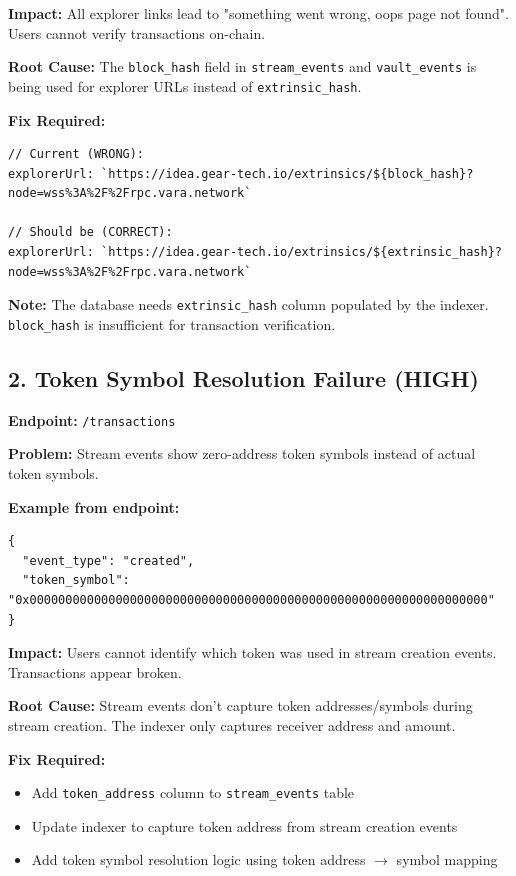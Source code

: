 \documentclass[11pt,a4paper]{article}
\begin{document}
\textbf{Impact:} All explorer links lead to "something went wrong, oops page not found". Users cannot verify transactions on-chain.

\textbf{Root Cause:} The \texttt{block\_hash} field in \texttt{stream\_events} and \texttt{vault\_events} is being used for explorer URLs instead of \texttt{extrinsic\_hash}.

\textbf{Fix Required:}
\begin{lstlisting}
// Current (WRONG):
explorerUrl: `https://idea.gear-tech.io/extrinsics/${block_hash}?node=wss%3A%2F%2Frpc.vara.network`

// Should be (CORRECT):
explorerUrl: `https://idea.gear-tech.io/extrinsics/${extrinsic_hash}?node=wss%3A%2F%2Frpc.vara.network`
\end{lstlisting}

\textbf{Note:} The database needs \texttt{extrinsic\_hash} column populated by the indexer. \texttt{block\_hash} is insufficient for transaction verification.

\subsection{2. Token Symbol Resolution Failure (HIGH)}

\textbf{Endpoint:} \texttt{/transactions}

\textbf{Problem:} Stream events show zero-address token symbols instead of actual token symbols.

\textbf{Example from endpoint:}
\begin{lstlisting}
{
  "event_type": "created",
  "token_symbol": "0x0000000000000000000000000000000000000000000000000000000000000000"
}
\end{lstlisting}

\textbf{Impact:} Users cannot identify which token was used in stream creation events. Transactions appear broken.

\textbf{Root Cause:} Stream events don't capture token addresses/symbols during stream creation. The indexer only captures receiver address and amount.

\textbf{Fix Required:}
\begin{itemize}
    \item Add \texttt{token\_address} column to \texttt{stream\_events} table
    \item Update indexer to capture token address from stream creation events
    \item Add token symbol resolution logic using token address $\rightarrow$ symbol mapping
\end{itemize}
\end{document}
